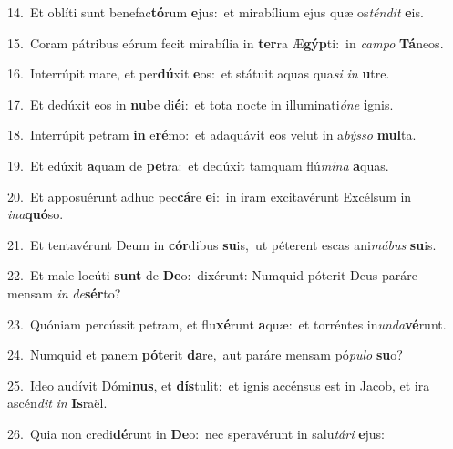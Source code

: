 {\numbfont\textcolor{\numbcolor}{14.}}~Et oblíti sunt benefac\-\textbf{tó}\-rum \textbf{e}\-jus:~\star et mirabílium ejus quæ os\-\textit{tén}\-\textit{dit} \textbf{e}\-is.\par
{\numbfont\textcolor{\numbcolor}{15.}}~Coram pátribus eórum fecit mirabília in \textbf{ter}\-ra Æ\-\textbf{gýp}\-ti:~\star in \textit{cam}\-\textit{po} \textbf{Tá}\-neos.\par
{\numbfont\textcolor{\numbcolor}{16.}}~Interrúpit mare, et per\-\textbf{dú}\-xit \textbf{e}\-os:~\star et státuit aquas qua\textit{si} \textit{in} \textbf{u}\-tre.\par
{\numbfont\textcolor{\numbcolor}{17.}}~Et dedúxit eos in \textbf{nu}\-be di\-\textbf{é}\-i:~\star et tota nocte in illuminati\-\textit{ó}\-\textit{ne} \textbf{i}\-gnis.\par
{\numbfont\textcolor{\numbcolor}{18.}}~Interrúpit petram \textbf{in} e\-\textbf{ré}\-mo:~\star et adaquávit eos velut in a\-\textit{býs}\-\textit{so} \textbf{mul}\-ta.\par
{\numbfont\textcolor{\numbcolor}{19.}}~Et edúxit \textbf{a}\-quam de \textbf{pe}\-tra:~\star et dedúxit tamquam flú\-\textit{mi}\-\textit{na} \textbf{a}\-quas.\par
{\numbfont\textcolor{\numbcolor}{20.}}~Et apposuérunt adhuc pec\-\textbf{cá}\-re \textbf{e}\-i:~\star in iram excitavérunt Excélsum in \textit{in}\-\textit{a}\textbf{quó}so.\par
{\numbfont\textcolor{\numbcolor}{21.}}~Et tentavérunt Deum in \textbf{cór}\-dibus \textbf{su}\-is,~\star ut péterent escas ani\-\textit{má}\-\textit{bus} \textbf{su}\-is.\par
{\numbfont\textcolor{\numbcolor}{22.}}~Et male locúti \textbf{sunt} de \textbf{De}\-o:~\star dixérunt: Numquid póterit Deus paráre mensam \textit{in} \textit{de}\-\textbf{sér}to?\par
{\numbfont\textcolor{\numbcolor}{23.}}~Quóniam percússit petram, et flu\-\textbf{xé}\-runt \textbf{a}\-quæ:~\star et torréntes in\-\textit{un}\-\textit{da}\textbf{vé}runt.\par
{\numbfont\textcolor{\numbcolor}{24.}}~Numquid et panem \textbf{pót}\-erit \textbf{da}\-re,~\star aut paráre mensam pó\-\textit{pu}\-\textit{lo} \textbf{su}\-o?\par
{\numbfont\textcolor{\numbcolor}{25.}}~Ideo audívit Dómi\-\textbf{nus}\-, et \textbf{dís}\-tulit:~\star et ignis accénsus est in Jacob, et ira ascén\textit{dit} \textit{in} \textbf{Is}\-raël.\par
{\numbfont\textcolor{\numbcolor}{26.}}~Quia non credi\-\textbf{dé}\-runt in \textbf{De}\-o:~\star nec speravérunt in salu\-\textit{tá}\-\textit{ri} \textbf{e}\-jus:\par
